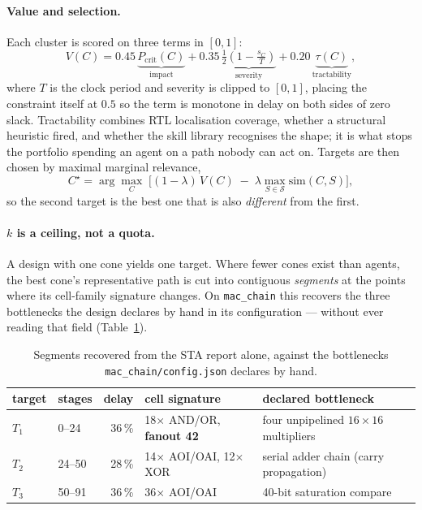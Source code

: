 \documentclass[11pt,a4paper]{article}
\begin{document}
\paragraph{Value and selection.}
Each cluster is scored on three terms in $[0,1]$:
%
\begin{equation}
V(C) = 0.45\,\underbrace{P_{\mathrm{crit}}(C)}_{\text{impact}}
     + 0.35\,\underbrace{\tfrac12\!\left(1-\tfrac{s_C}{T}\right)}_{\text{severity}}
     + 0.20\,\underbrace{\tau(C)}_{\text{tractability}},
\end{equation}
%
where $T$ is the clock period and severity is clipped to $[0,1]$, placing the
constraint itself at $0.5$ so the term is monotone in delay on both sides of
zero slack. Tractability combines RTL localisation coverage, whether a
structural heuristic fired, and whether the skill library recognises the
shape; it is what stops the portfolio spending an agent on a path nobody can
act on. Targets are then chosen by maximal marginal relevance,
%
\begin{equation}
C^\star = \arg\max_{C}\;\Big[(1-\lambda)\,V(C) \;-\; \lambda \max_{S \in \mathcal{S}} \mathrm{sim}(C,S)\Big],
\end{equation}
%
so the second target is the best one that is also \emph{different} from the
first.

\paragraph{$k$ is a ceiling, not a quota.}
A design with one cone yields one target. Where fewer cones exist than agents,
the best cone's representative path is cut into contiguous \emph{segments} at
the points where its cell-family signature changes. On \texttt{mac\_chain} this
recovers the three bottlenecks the design declares by hand in its
configuration --- without ever reading that field (Table~\ref{tab:segments}).

\begin{table}[t]
\centering
\caption{Segments recovered from the STA report alone, against the
bottlenecks \texttt{mac\_chain/config.json} declares by hand.}
\label{tab:segments}
\begin{tabular}{@{}llrlp{5.1cm}@{}}
\toprule
target & stages & delay & cell signature & declared bottleneck \\
\midrule
$T_1$ & 0--24  & 36\,\% & 18$\times$ AND/OR, \textbf{fanout 42} & four unpipelined $16\times16$ multipliers \\
$T_2$ & 24--50 & 28\,\% & 14$\times$ AOI/OAI, 12$\times$ XOR & serial adder chain (carry propagation) \\
$T_3$ & 50--91 & 36\,\% & 36$\times$ AOI/OAI & 40-bit saturation compare \\
\bottomrule
\end{tabular}
\end{table}
\end{document}
